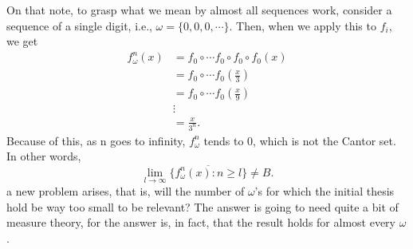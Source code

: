 \documentclass{article}
\begin{document}
On that note, to grasp what we mean by almost all sequences work, consider a sequence of a single digit, i.e., $\omega =\{0, 0, 0, \cdots\} $. Then, when we apply this to $f_{i}$, we get
  \begin{align*}
    f_{\omega}^{n}(x) &= f_{0}\circ{\cdots}f_{0}\circ{f_{0}}\circ{f_{0}}(x)\\
                      &= f_{0}\circ{\cdots}f_{0}(\frac{x}{3}) \\
                      &= f_{0}\circ{\cdots}f_{0}(\frac{x}{9}) \\
                      &\vdots\\
                      &= \frac{x}{3^{n}}.
  \end{align*}
  Because of this, as n goes to infinity, $f_{\omega}^{n}$ tends to 0, which is not the Cantor set. In other words,
  $$
    \lim_{l\to\infty}\overline{\{f_{\omega}^{n}(x):n\geq{l}\}}\neq B.
  $$
  a new problem arises, that is, will the number of $\omega$'s for which the initial thesis hold be way too small to be relevant? The answer is going to need
quite a bit of measure theory, for the answer is, in fact, that the result holds for almost every $\omega$.
\end{document}
